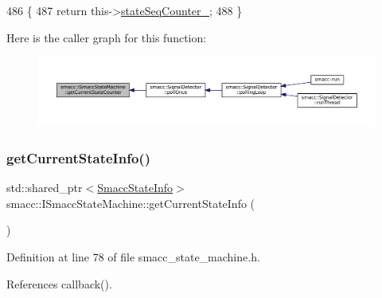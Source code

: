 \begin{DoxyCode}
486 \{
487   \textcolor{keywordflow}{return} this->\hyperlink{classsmacc_1_1ISmaccStateMachine_ab41ee07d20715142e2f7c92d551b2bd6}{stateSeqCounter\_};
488 \}
\end{DoxyCode}
Here is the caller graph for this function\+:
\nopagebreak
\begin{figure}[H]
\begin{center}
\leavevmode
\includegraphics[width=350pt]{classsmacc_1_1ISmaccStateMachine_aad27c0182b53245d0aded22e63cd83bd_icgraph}
\end{center}
\end{figure}
\mbox{\label{classsmacc_1_1ISmaccStateMachine_a4738679e8e5f7adab35e610dce0bfff7}} 
\subsubsection{\texorpdfstring{get\+Current\+State\+Info()}{getCurrentStateInfo()}}
{\footnotesize\ttfamily std\+::shared\+\_\+ptr$<$\hyperlink{classsmacc_1_1introspection_1_1SmaccStateInfo}{Smacc\+State\+Info}$>$ smacc\+::\+I\+Smacc\+State\+Machine\+::get\+Current\+State\+Info (\begin{DoxyParamCaption}{ }\end{DoxyParamCaption})\hspace{0.3cm}{\ttfamily [inline]}}



Definition at line 78 of file smacc\+\_\+state\+\_\+machine.\+h.



References callback().


